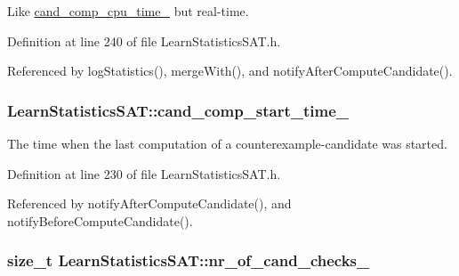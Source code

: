 Like \hyperlink{classLearnStatisticsSAT_af977c00fbf0f9978f92dd5c997577a06}{cand\-\_\-comp\-\_\-cpu\-\_\-time\-\_\-} but real-\/time. 



Definition at line 240 of file Learn\-Statistics\-S\-A\-T.\-h.



Referenced by log\-Statistics(), merge\-With(), and notify\-After\-Compute\-Candidate().

\hypertarget{classLearnStatisticsSAT_a73f2f0e2ee619df05b22261e7b691320}{
\subsubsection[{cand\-\_\-comp\-\_\-start\-\_\-time\-\_\-}]{ Learn\-Statistics\-S\-A\-T\-::cand\-\_\-comp\-\_\-start\-\_\-time\-\_\-\hspace{0.3cm}{\ttfamily [protected]}}}\label{classLearnStatisticsSAT_a73f2f0e2ee619df05b22261e7b691320}


The time when the last computation of a counterexample-\/candidate was started. 



Definition at line 230 of file Learn\-Statistics\-S\-A\-T.\-h.



Referenced by notify\-After\-Compute\-Candidate(), and notify\-Before\-Compute\-Candidate().

\hypertarget{classLearnStatisticsSAT_a1c3b6dff92cbcec06c944606c3555b64}{
\subsubsection[{nr\-\_\-of\-\_\-cand\-\_\-checks\-\_\-}]{\setlength{\rightskip}{0pt plus 5cm}size\-\_\-t Learn\-Statistics\-S\-A\-T\-::nr\-\_\-of\-\_\-cand\-\_\-checks\-\_\-\hspace{0.3cm}{\ttfamily [protected]}}}\label{classLearnStatisticsSAT_a1c3b6dff92cbcec06c944606c3555b64}


